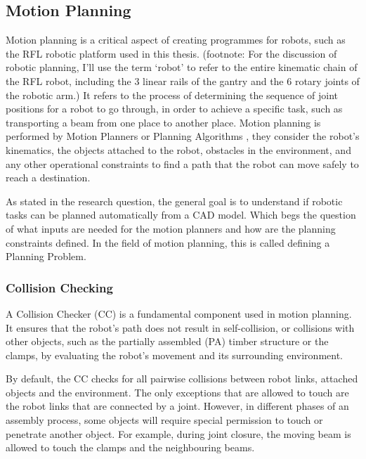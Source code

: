 \subsection{Motion Planning}
\label{subsection:exploration_2_motion_planning}

Motion planning is a critical aspect of creating programmes for robots, such as the RFL robotic platform used in this thesis. (footnote: For the discussion of robotic planning, I’ll use the term ‘robot’ to refer to the entire kinematic chain of the RFL robot, including the 3 linear rails of the gantry and the 6 rotary joints of the robotic arm.) It refers to the process of determining the sequence of joint positions for a robot to go through, in order to achieve a specific task, such as transporting a beam from one place to another place. Motion planning is performed by Motion Planners or Planning Algorithms \parencite{lavallePlanningAlgorithms2006}, they consider the robot's kinematics, the objects attached to the robot, obstacles in the environment, and any other operational constraints to find a path that the robot can move safely to reach a destination.

As stated in the research question, the general goal is to understand if robotic tasks can be planned automatically from a CAD model. Which begs the question of what inputs are needed for the motion planners and how are the planning constraints defined. In the field of motion planning, this is called defining a Planning Problem.

\subsubsection{Collision Checking}
\label{subsubsection:exploration_2_collision_checking}

A Collision Checker (CC) is a fundamental component used in motion planning. It ensures that the robot's path does not result in self-collision, or collisions with other objects, such as the partially assembled (PA) timber structure or the clamps, by evaluating the robot's movement and its surrounding environment. 

By default, the CC checks for all pairwise collisions between robot links, attached objects and the environment. The only exceptions that are allowed to touch are the robot links that are connected by a joint. However, in different phases of an assembly process, some objects will require special permission to touch or penetrate another object. For example, during joint closure, the moving beam is allowed to touch the clamps and the neighbouring beams. 

